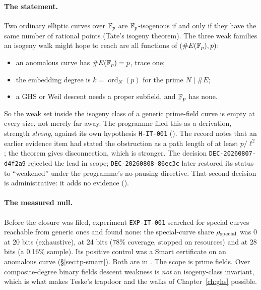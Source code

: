 \paragraph{The statement.} Two ordinary elliptic curves over $\mathbb{F}_p$ are
$\mathbb{F}_p$-isogenous if and only if they have the same number of rational
points (Tate's isogeny theorem). The three weak families an isogeny walk
might hope to reach are all functions of $(\#E(\mathbb{F}_p),p)$:
\begin{itemize}
\item an anomalous curve has $\#E(\mathbb{F}_p)=p$, trace one;
\item the embedding degree is $k=\operatorname{ord}_N(p)$ for the prime
  $N\mid\#E$;
\item a GHS or Weil descent needs a proper subfield, and $\mathbb{F}_p$ has none.
\end{itemize}
So the weak set inside the isogeny class of a generic prime-field curve is
empty at every size, not merely far away. The programme filed this as a
derivation, strength \emph{strong}, against its own hypothesis
\texttt{H-IT-001} ().
The record notes that an earlier evidence item had stated the obstruction as
a path length of at least $p/\ell^2$; the theorem gives disconnection, which
is stronger. The decision \texttt{DEC-20260807-d4f2a9} rejected the lead in
scope; \texttt{DEC-20260808-86ec3c} later restored its status to
``weakened'' under the programme's no-pausing directive. That second
decision is administrative: it adds no evidence
().

\paragraph{The measured null.} Before the closure was filed, experiment
\texttt{EXP-IT-001} searched for special curves reachable from generic ones
and found none: the special-curve share $\rho_{\rm special}$ was $0$ at
20 bits (exhaustive), at 24 bits (78\% coverage, stopped on resources) and
at 28 bits (a 0.16\% sample). Its positive control was a Smart certificate
on an anomalous curve (\S\ref{sec:tp-smart}). Both are in
. The scope is
prime fields. Over composite-degree binary fields descent weakness is
\emph{not} an isogeny-class invariant, which is what makes Teske's trapdoor
and the walks of Chapter~\ref{ch:ghs} possible.

